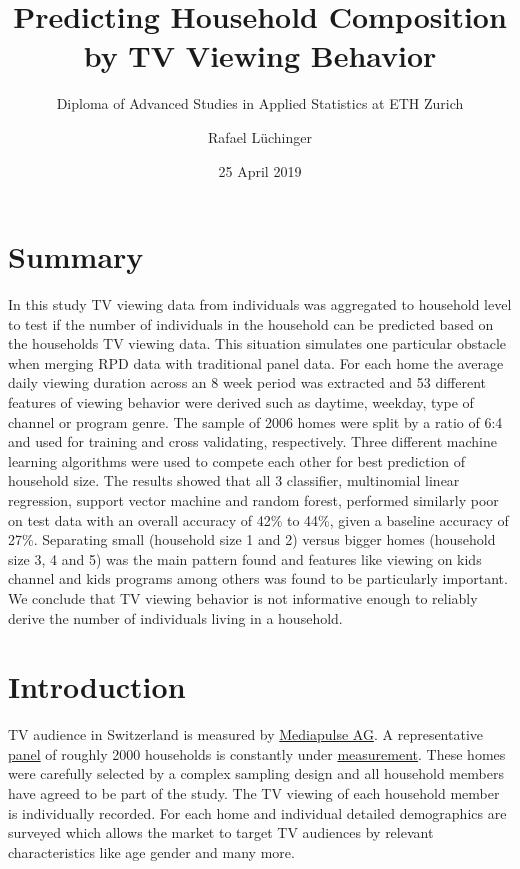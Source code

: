 \documentclass[]{article}
\title{Predicting Household Composition by TV Viewing Behavior}
\subtitle{Diploma of Advanced Studies in Applied Statistics at ETH Zurich}
\author{Rafael Lüchinger}
\date{25 April 2019}
\begin{document}
\maketitle

{
\setcounter{tocdepth}{2}
\tableofcontents
}
\hypertarget{summary}{%
\section{Summary}\label{summary}}

In this study TV viewing data from individuals was aggregated to
household level to test if the number of individuals in the household
can be predicted based on the households TV viewing data. This situation
simulates one particular obstacle when merging RPD data with traditional
panel data. For each home the average daily viewing duration across an 8
week period was extracted and 53 different features of viewing behavior
were derived such as daytime, weekday, type of channel or program genre.
The sample of 2006 homes were split by a ratio of 6:4 and used for
training and cross validating, respectively. Three different machine
learning algorithms were used to compete each other for best prediction
of household size. The results showed that all 3 classifier, multinomial
linear regression, support vector machine and random forest, performed
similarly poor on test data with an overall accuracy of 42\% to 44\%,
given a baseline accuracy of 27\%. Separating small (household size 1
and 2) versus bigger homes (household size 3, 4 and 5) was the main
pattern found and features like viewing on kids channel and kids
programs among others was found to be particularly important. We
conclude that TV viewing behavior is not informative enough to reliably
derive the number of individuals living in a household.

\hypertarget{introduction}{%
\section{Introduction}\label{introduction}}

TV audience in Switzerland is measured by
\href{https:://www.mediapulse.ch/en}{Mediapulse AG}. A representative
\href{https:://www.mediapulse.ch/en/tv/research-method/the-panel.html}{panel}
of roughly 2000 households is constantly under
\href{https:://www.mediapulse.ch/en/tv/research-method/the-measuring-technique.html}{measurement}.
These homes were carefully selected by a complex sampling design and all
household members have agreed to be part of the study. The TV viewing of
each household member is individually recorded. For each home and
individual detailed demographics are surveyed which allows the market to
target TV audiences by relevant characteristics like age gender and many
more.
\end{document}
